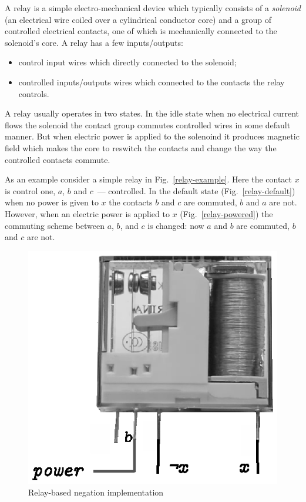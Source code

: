 A relay is a simple electro-mechanical device which typically consists of a \emph{solenoid} (an electrical wire coiled over
a cylindrical conductor core) and a group of controlled electrical contacts, one of which is mechanically connected to the solenoid's core.
A relay has a few inputs/outputs:

\begin{itemize}
\item control input wires which directly connected to the solenoid;
\item controlled inputs/outputs wires which connected to the contacts the relay controls.
\end{itemize}

A relay usually operates in two states. In the idle state when no electrical current flows the solenoid the contact group commutes
controlled wires in some default manner. But when electric power is applied to the solenoind it produces magnetic field which
makes the core to reswitch the contacts and change the way the controlled contacts commute.

As an example consider a simple relay in Fig.~\ref{relay-example}. Here the contact $x$ is control one, $a$, $b$ and $c$~--- controlled.
In the default state (Fig.~\ref{relay-default}) when no power is given to $x$ the contacts $b$ and $c$ are commuted, $b$ and $a$ are not.
However, when an electric power is applied to $x$ (Fig.~\ref{relay-powered}) the commuting scheme between $a$, $b$, and $c$ is
changed: now $a$ and $b$ are commuted, $b$ and $c$ are not.

\begin{figure}[t]
  \centering
  \includegraphics{images/06-08.eps}
  \caption{Relay-based negation implementation}
  \label{relay-negation}
\end{figure}

